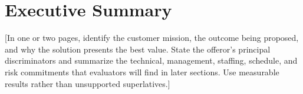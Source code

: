
\renewcommand{\ProposalTechnicalPOC}{\OrganizationDefaultPOC}
\renewcommand{\ProposalTechnicalPOCEmail}{\OrganizationEmail}
\renewcommand{\ProposalTechnicalPOCPhone}{\OrganizationPhone}
\renewcommand{\ProposalTechnicalPOCAddress}{\address}
\renewcommand{\ProposalContractsPOC}{\OrganizationDefaultPOC}
\renewcommand{\ProposalContractsPOCEmail}{\OrganizationEmail}
\renewcommand{\ProposalContractsPOCPhone}{\OrganizationPhone}
\renewcommand{\ProposalContractsPOCAddress}{\address}
\renewcommand{\ProposalSecurityPOC}{\OrganizationDefaultPOC}
\renewcommand{\ProposalSecurityPOCEmail}{\OrganizationEmail}
\renewcommand{\ProposalSecurityPOCPhone}{\OrganizationPhone}
\renewcommand{\ProposalSecurityPOCAddress}{\address}

\def \doctitle{Volume I (Technical and Management Proposal)}
\def \cost{\$1,000,000}

\def \tin{33-3333333}
\def \awardtype{Cost Plus Fixed Fee (CPFF)}
\def \pop{January 1, 2027--December 31, 2027 (12 months)}



\proposalcover
\whitepapercover
\docinfo

\pagestyle{plain}



\section{Executive Summary}
\label{sec:executive-summary}
[In one or two pages, identify the customer mission, the outcome being
proposed, and why the solution presents the best value. State the offeror's
principal discriminators and summarize the technical, management, staffing,
schedule, and risk commitments that evaluators will find in later sections.
Use measurable results rather than unsupported superlatives.]

